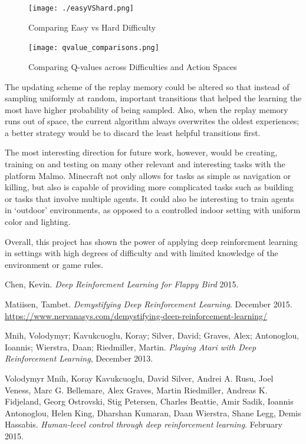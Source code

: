 \documentclass{article}
\begin{document}
\begin{multicols}{2}
\begin{figure}[H]
\caption{Comparing Easy vs Hard Difficulty}
\centering
\texttt{[image: ./easyVShard.png]}
\label{fig:rewardCompEasy_vs_Hard}
\end{figure}

\begin{figure}[H]
\caption{Comparing Q-values across Difficulties and Action Spaces}
\centering
\texttt{[image: qvalue\_comparisons.png]}
\label{fig:qvalueComp}
\end{figure}


The updating scheme of the replay memory could be altered so that instead of sampling uniformly at random, important transitions that helped the learning the most have higher probability of being sampled. Also, when the replay memory runs out of space, the current algorithm always overwrites the oldest experiences; a better strategy would be to discard the least helpful transitions first.

The most interesting direction for future work, however, would be creating, training on and testing on many other relevant and interesting tasks with the platform Malmo. Minecraft not only allows for tasks as simple as navigation or killing, but also is capable of providing more complicated tasks such as building or tasks that involve multiple agents.
It could also be interesting to train agents in `outdoor' environments, as opposed to a controlled indoor setting with uniform color and lighting.

Overall, this project has shown the power of applying deep reinforcment learning in settings with high degrees of difficulty and with limited knowledge of the environment or game rules.

\end{multicols}



\begin{thebibliography}{9}

Chen, Kevin.
\emph{Deep Reinforcment Learning for Flappy Bird}
2015.

Matiisen, Tambet.
\emph{Demystifying Deep Reinforcement Learning}. December 2015.
\url{https://www.nervanasys.com/demystifying-deep-reinforcement-learning/}

Mnih, Volodymyr; Kavukcuoglu, Koray; Silver, David; Graves, Alex; Antonoglou, Ioannis; Wierstra, Daan; Riedmiller, Martin.
\emph{Playing Atari with Deep Reinforcement Learning},
December 2013.

Volodymyr Mnih,	Koray Kavukcuoglu,	David Silver, Andrei A. Rusu, Joel Veness, Marc G. Bellemare, Alex Graves,	Martin Riedmiller, Andreas K. Fidjeland, Georg Ostrovski, Stig Petersen, Charles Beattie, Amir Sadik, Ioannis Antonoglou,	Helen King,	Dharshan Kumaran, Daan Wierstra, Shane Legg, Demis Hassabis.
\emph{Human-level control through deep reinforcement learning}.
February 2015.

\end{thebibliography}
\end{document}
